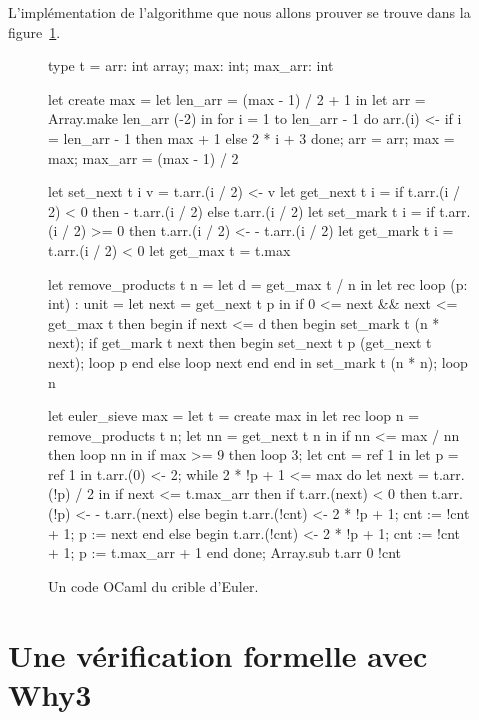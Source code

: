 \documentclass[a4paper]{easychair}
\begin{document}
L'implémentation de l'algorithme que nous allons prouver se trouve dans la
figure~\ref{fig:codeOCaml}.

\begin{figure}[tp]
\begin{ocaml}
type t = { arr: int array; max: int; max_arr: int }

let create max =
  let len_arr = (max - 1) / 2 + 1 in
  let arr = Array.make len_arr (-2) in
  for i = 1 to len_arr - 1 do
    arr.(i) <- if i = len_arr - 1 then max + 1 else 2 * i + 3
  done;
  { arr = arr; max = max; max_arr = (max - 1) / 2 }

let set_next t i v = t.arr.(i / 2) <- v
let get_next t i = if t.arr.(i / 2) < 0 then - t.arr.(i / 2) else t.arr.(i / 2)
let set_mark t i = if t.arr.(i / 2) >= 0 then t.arr.(i / 2) <- - t.arr.(i / 2)
let get_mark t i = t.arr.(i / 2) < 0
let get_max t = t.max

let remove_products t n =
  let d = get_max t / n in
  let rec loop (p: int) : unit =
    let next = get_next t p in
    if 0 <= next && next <= get_max t then begin
      if next <= d then begin
        set_mark t (n * next);
        if get_mark t next then begin set_next t p (get_next t next); loop p end
        else loop next
      end end in
  set_mark t (n * n); loop n

let euler_sieve max =
  let t = create max in
  let rec loop n =
    remove_products t n;
    let nn = get_next t n in
    if nn <= max / nn then loop nn in
  if max >= 9 then loop 3;
  let cnt = ref 1 in
  let p = ref 1 in t.arr.(0) <- 2;
  while 2 * !p + 1 <= max do
    let next = t.arr.(!p) / 2 in
    if next <= t.max_arr then
      if t.arr.(next) < 0 then t.arr.(!p) <- - t.arr.(next)
      else begin t.arr.(!cnt) <- 2 * !p + 1; cnt := !cnt + 1; p := next end
    else begin t.arr.(!cnt) <- 2 * !p + 1; cnt := !cnt + 1; p := t.max_arr + 1 end
  done;
  Array.sub t.arr 0 !cnt
\end{ocaml}
\caption{Un code OCaml du crible d'Euler.}
\label{fig:codeOCaml}
\end{figure}

\section{Une vérification formelle avec Why3}
\label{sec:preuve}

\end{document}
